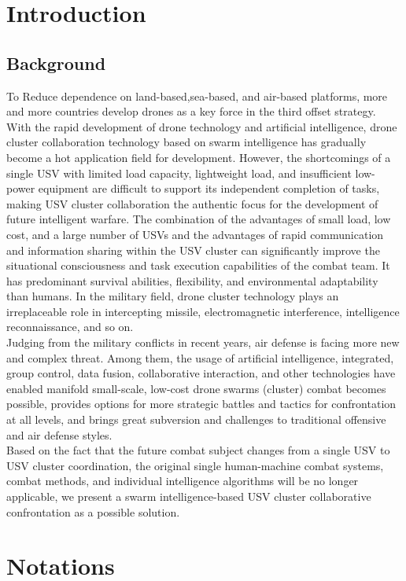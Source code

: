 \documentclass{mcmthesis}
\begin{document}
\section{Introduction}
\subsection{Background}
To Reduce dependence on land-based,sea-based, and air-based platforms, more and more countries develop drones as a key force in the third offset strategy. With the rapid development of drone technology and artificial intelligence, drone cluster collaboration technology based on swarm intelligence has gradually become a hot application field for development. However, the shortcomings of a single USV with limited load capacity, lightweight load, and insufficient low-power equipment are difficult to support its independent completion of tasks, making USV cluster collaboration the authentic focus for the development of future intelligent warfare. The combination of the advantages of small load, low cost, and a large number of USVs and the advantages of rapid communication and information sharing within the USV cluster can significantly improve the situational consciousness and task execution capabilities of the combat team. It has predominant survival abilities, flexibility, and environmental adaptability than humans. In the military field, drone cluster technology plays an irreplaceable role in intercepting missile, electromagnetic interference, intelligence reconnaissance, and so on.\\
Judging from the military conflicts in recent years, air defense is facing more new and complex threat. Among them, the usage of artificial intelligence, integrated, group control, data fusion, collaborative interaction, and other technologies have enabled manifold small-scale, low-cost drone swarms (cluster) combat becomes possible, provides options for more strategic battles and tactics for confrontation at all levels, and brings great subversion and challenges to traditional offensive and air defense styles.\\
Based on the fact that the future combat subject changes from a single USV to USV cluster coordination, the original single human-machine combat systems, combat methods, and individual intelligence algorithms will be no longer applicable, we present a swarm intelligence-based USV cluster collaborative confrontation as a possible solution.


\section{Notations}
\end{document}
